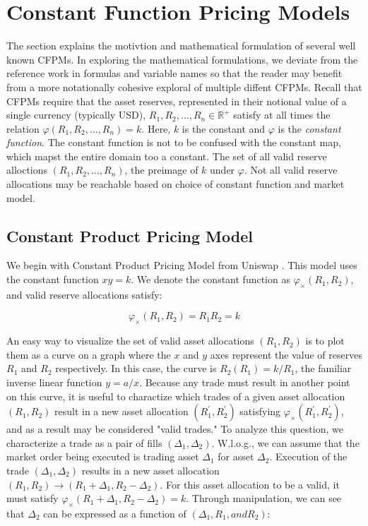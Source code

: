 \documentclass{article}
\begin{document}
\section{Constant Function Pricing Models}
\label{sec:cfpm}

The section explains the motivtion and mathematical formulation of several well known CFPMs. In exploring the mathematical formulations, we deviate from the reference work in formulas and variable names so that the reader may benefit from a more notationally cohesive exploral of multiple diffent CFPMs. Recall that CFPMs require that the asset reserves, represented in their notional value of a single currency (typically USD), $R_{1}, R_{2}, \dots, R_{n} \in \mathbb{R}^{+}$ satisfy at all times the relation $\varphi(R_{1}, R_{2}, \dots, R_{n}) = k$. Here, $k$ is the constant and $\varphi$ is the \emph{constant function}. The constant function is not to be confused with the constant map, which mapst the entire domain too a constant. The set of all valid reserve alloctions $(R_{1}, R_{2}, \dots, R_{n})$, the preimage of $k$ under $\varphi$. Not all valid reserve allocations may be reachable based on choice of constant function and market model.

\subsection{Constant Product Pricing Model}
\label{sec:cspm}
We begin with Constant Product Pricing Model from Uniswap \cite{uniswapv2}. This model uses the constant function $xy = k$. We denote the constant function as $\varphi_{\times}(R_{1}, R_{2})$, and valid reserve allocations satisfy:

\begin{equation}
\label{eq:cspm}
\varphi_{\times}(R_1, R_2) = R_1R_2 = k
\end{equation}

An easy way to visualize the set of valid asset allocations $(R_{1}, R_{2})$ is to plot them as a curve on a graph where the $x$ and $y$ axes represent the value of reserves $R_1$ and $R_2$ respectively. In this case, the curve is $R_2(R_1) = k / R_1$, the familiar inverse linear function $y = a / x$. Because any trade must result in another point on this curve, it is useful to charactize which trades of a given asset allocation $(R_{1}, R_{2})$ result in a new asset allocation $(R_{1}^{\prime}, R_{2}^{\prime})$ satisfying $\varphi_{\times}(R_{1}^{\prime}, R_{2}^{\prime})$, and as a result may be considered "valid trades." To analyze this question, we characterize a trade as a pair of fills $(\Delta_1, \Delta_2)$. W.l.o.g., we can assume that the market order being executed is trading asset $\Delta_1$ for asset $\Delta_2$. Execution of the trade $(\Delta_1, \Delta_2)$ results in a new asset allocation $(R_1, R_2) \rightarrow (R_1 + \Delta_1, R_2 - \Delta_2)$. For this asset allocation to be a valid, it must satisfy $\varphi_{\times}(R_1 + \Delta_1, R_2 - \Delta_2) = k$. Through manipulation, we can see that $\Delta_2$ can be expressed as a function of $(\Delta_1, R_1, and R_2)$:
\end{document}
